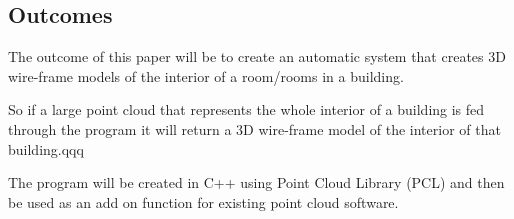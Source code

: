 

\subsection{Outcomes}

The outcome of this paper will be to create an automatic system that creates 3D wire-frame models of the interior of a room/rooms in a building. 

So if a large point cloud that represents the whole interior of a building is fed through the program it will return a 3D wire-frame model of the interior of that building.qqq

The program will be created in C++ using Point Cloud Library (PCL) and then be used as an add on function for existing point cloud software.
